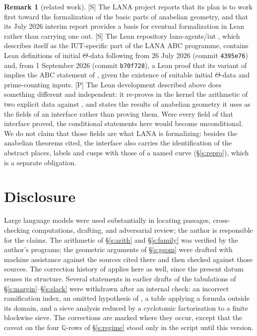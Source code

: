 \documentclass[11pt]{article}
\theoremstyle{plain}
\theoremstyle{definition}
\newtheorem{remark}{Remark}
\begin{document}
\begin{remark}[related work]
\textup{[S]} The LANA project reports that its plan is to work first toward the
formalization of the basic parts of anabelian geometry, and that its July 2026 interim
report provides a basis for eventual formalization in Lean rather than carrying one
out.  \textup{[S]} The Lean repository lana-agents/iut \cite{LANAiut}, which describes
itself as the IUT-specific part of the LANA ABC programme, contains Lean definitions of
initial $\Theta$-data following \cite[Def.~3.1]{IUT1} from 26 July 2026 (commit
\texttt{4395e76}) and, from 1 September 2026 (commit \texttt{b70f728}), a Lean proof
that its variant of \cite[Cor.~3.12]{IUT3} implies the ABC statement of
\cite[Cor.~2.3]{IUT4}, given the existence of suitable initial $\Theta$-data and
prime-counting inputs.  \textup{[P]} The Lean development described above does something different and
independent: it re-proves in the kernel the arithmetic of two explicit data against
\cite[Def.~3.1]{IUT1}, and states the results of anabelian geometry it uses as the
fields of an interface rather than proving them.  Were every field of that interface
proved, the conditional statements here would become unconditional.  We do not claim
that those fields are what LANA is formalizing: besides the anabelian theorems cited,
the interface also carries the identification of the abstract places, labels and cusps
with those of a named curve (\S\ref{s:repro}), which is a separate obligation.
\end{remark}

\section*{Disclosure}

Large language models were used substantially in locating passages, cross-checking
computations, drafting, and adversarial review; the author is responsible for the
claims.  The arithmetic of \S\ref{s:arith} and \S\ref{s:family} was verified by the
author's programs; the geometric arguments of \S\ref{s:geom} were drafted with
machine assistance against the sources cited there and then checked against those
sources.  The correction history of \cite{First} applies here as well, since the
present datum reuses its structure.  Several statements in earlier drafts of the
tabulations of \S\ref{s:margin}--\S\ref{s:slack} were withdrawn after an internal check: an incorrect ramification index, an omitted hypothesis of
\cite[Def.~3.1(c)]{IUT1}, a table applying a formula outside its domain, and a sieve
analysis reduced by a cyclotomic factorisation to a finite blockwise sieve.  The corrections are marked where they occur, except that the caveat on the four
$\mathbb{Q}$-rows of \S\ref{s:regime} stood only in the script until this version.
\end{document}
